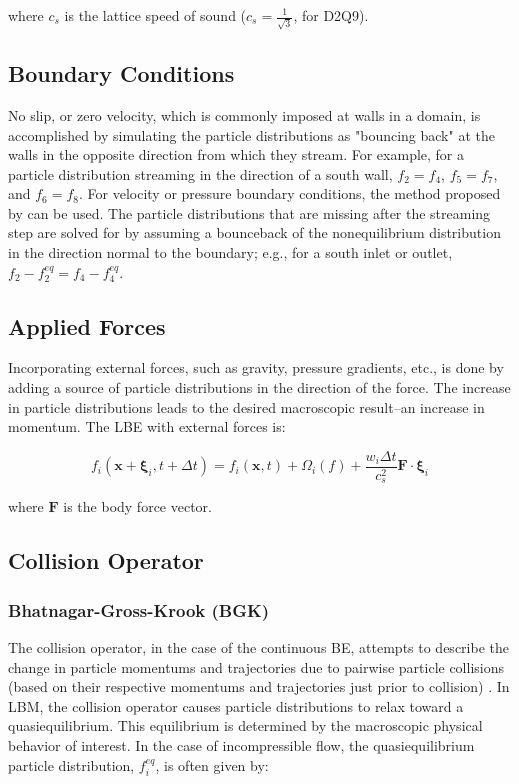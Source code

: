 \documentclass{article}
\newcommand{\pos}{\mathbf{x}}
\newcommand{\pvel}{\boldsymbol{\xi}}
\begin{document}
\noindent where $c_s$ is the lattice speed of sound ($c_s = \frac{1}{\sqrt{3}}$, for D2Q9).

\subsection{Boundary Conditions}

No slip, or zero velocity, which is commonly imposed at walls in a domain, is accomplished by simulating the particle distributions as "bouncing back" at the walls in the opposite direction from which they stream.
For example, for a particle distribution streaming in the direction of a south wall, $f_2 = f_4$, $f_5 = f_7$, and $f_6 = f_8$.
For velocity or pressure boundary conditions, the method proposed by \citet{zou1997pressure} can be used.
The particle distributions that are missing after the streaming step are solved for by assuming a bounceback of the nonequilibrium distribution in the direction normal to the boundary; e.g., for a south inlet or outlet, $f_2 - f_2^{eq} = f_4 - f_4^{eq}$.

\subsection{Applied Forces}

Incorporating external forces, such as gravity, pressure gradients, etc., is done by adding a source of particle distributions in the direction of the force.
The increase in particle distributions leads to the desired macroscopic result--an increase in momentum.
The LBE with external forces is:

\begin{equation}
f_i(\pos + \pvel_i, t + \Delta t) = f_i(\pos, t) + \Omega_i(f) + \frac{w_i \Delta t}{c_s^2} \mathbf{F} \cdot \pvel_i
\end{equation}

\noindent where $\mathbf{F}$ is the body force vector.

\subsection{Collision Operator}

\subsubsection{Bhatnagar-Gross-Krook (BGK)} \label{sec:bgk}

The collision operator, in the case of the continuous BE, attempts to describe the change in particle momentums and trajectories due to pairwise particle collisions (based on their respective momentums and trajectories just prior to collision) \cite{Cer90}.
In LBM, the collision operator causes particle distributions to relax toward a quasiequilibrium. %
This equilibrium is determined by the macroscopic physical behavior of interest.
In the case of incompressible flow, the quasiequilibrium particle distribution, $f_i^{eq}$, is often given by:
\end{document}
